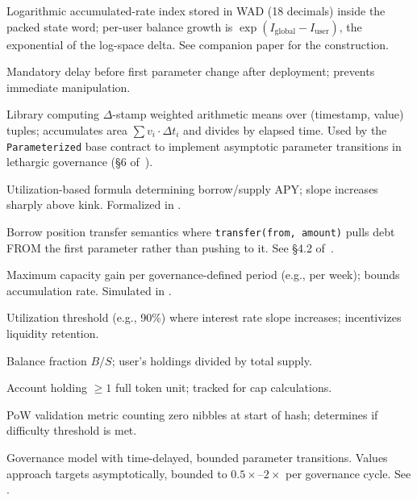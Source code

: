 \documentclass[10pt,a4paper,twocolumn]{article}
\begin{document}
\begin{description}[style=nextline, leftmargin=2.5em, labelindent=0em, font=\normalfont\bfseries]

\item[Index] Logarithmic accumulated-rate index stored in WAD (18 decimals) inside the packed state word; per-user balance growth is $\exp(I_{\text{global}} - I_{\text{user}})$, the exponential of the log-space delta. See companion paper \cite{log} for the construction.

\item[Initial Lock Period] Mandatory delay before first parameter change after deployment; prevents immediate manipulation.

\item[Integrator] Library computing $\Delta$-stamp weighted arithmetic means over (timestamp, value) tuples; accumulates area $\sum v_i \cdot \Delta t_i$ and divides by elapsed time. Used by the \texttt{Parameterized} base contract to implement asymptotic parameter transitions in lethargic governance (\S6 of~\cite{wp}).

\item[Interest Rate Model] Utilization-based formula determining borrow/supply APY; slope increases sharply above kink. Formalized in \cite{mtp}.

\item[Inverted Transfer] Borrow position transfer semantics where \texttt{transfer(from, amount)} pulls debt FROM the first parameter rather than pushing to it. See \S4.2 of~\cite{wp}.

\item[Iteration Cap] Maximum capacity gain per governance-defined period (e.g., per week); bounds accumulation rate. Simulated in \cite{sim}.


\item[Kink] Utilization threshold (e.g., 90\%) where interest rate slope increases; incentivizes liquidity retention.


\item[Lambda ($\lambda$)] Balance fraction $B/S$; user's holdings divided by total supply.

\item[Large Holder] Account holding $\geq 1$ full token unit; tracked for cap calculations.

\item[Leading Zeros] PoW validation metric counting zero nibbles at start of hash; determines if difficulty threshold is met.

\item[Lethargic Governance] Governance model with time-delayed, bounded parameter transitions. Values approach targets asymptotically, bounded to $0.5\times$--$2\times$ per governance cycle. See \cite[\S A]{wp}.


\end{description}
\end{document}
